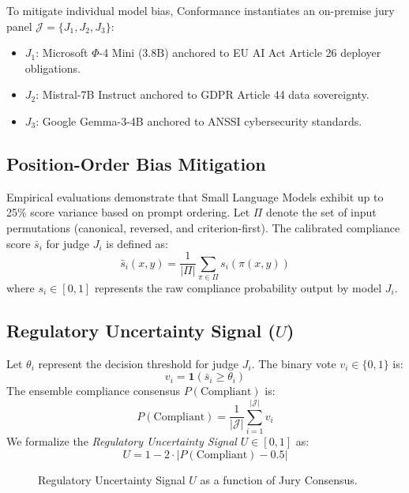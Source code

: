 \documentclass[conference,10pt]{IEEEtran}
\begin{document}
To mitigate individual model bias, Conformance instantiates an on-premise jury panel $\mathcal{J} = \{J_1, J_2, J_3\}$:
\begin{itemize}
    \item $J_1$: Microsoft $\Phi$-4 Mini ($3.8\text{B}$) anchored to EU AI Act Article 26 deployer obligations.
    \item $J_2$: Mistral-7B Instruct anchored to GDPR Article 44 data sovereignty.
    \item $J_3$: Google Gemma-3-4B anchored to ANSSI cybersecurity standards.
\end{itemize}

\subsection{Position-Order Bias Mitigation}
Empirical evaluations demonstrate that Small Language Models exhibit up to 25\% score variance based on prompt ordering. Let $\Pi$ denote the set of input permutations (canonical, reversed, and criterion-first). The calibrated compliance score $\bar{s}_i$ for judge $J_i$ is defined as:
\begin{equation}
    \bar{s}_i(x, y) = \frac{1}{|\Pi|} \sum_{\pi \in \Pi} s_i(\pi(x, y))
\end{equation}
where $s_i \in [0, 1]$ represents the raw compliance probability output by model $J_i$.

\subsection{Regulatory Uncertainty Signal ($U$)}
Let $\theta_i$ represent the decision threshold for judge $J_i$. The binary vote $v_i \in \{0, 1\}$ is:
\begin{equation}
    v_i = \mathbf{1}(\bar{s}_i \ge \theta_i)
\end{equation}
The ensemble compliance consensus $P(\text{Compliant})$ is:
\begin{equation}
    P(\text{Compliant}) = \frac{1}{|\mathcal{J}|} \sum_{i=1}^{|\mathcal{J}|} v_i
\end{equation}
We formalize the \textit{Regulatory Uncertainty Signal} $U \in [0, 1]$ as:
\begin{equation}
    U = 1 - 2 \cdot \left| P(\text{Compliant}) - 0.5 \right|
\end{equation}

\begin{figure}[h]
\centering
{}
\caption{Regulatory Uncertainty Signal $U$ as a function of Jury Consensus.}
\label{fig:uncertainty}
\end{figure}
\end{document}
